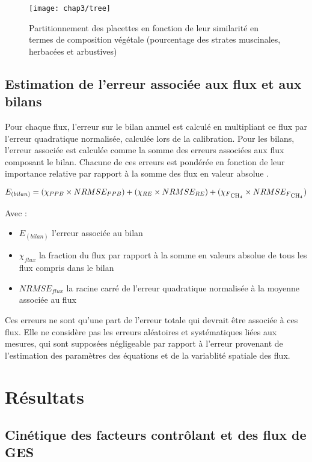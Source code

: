 \begin{figure}[t]
\centering
\texttt{[image: chap3/tree]}
\caption{Partitionnement des placettes en fonction de leur similarité en termes de composition végétale (pourcentage des strates muscinales, herbacées et arbustives)}
\label{fig:tree}
\end{figure}


\subsection{Estimation de l'erreur associée aux flux et aux bilans}

Pour chaque flux, l'erreur sur le bilan annuel est calculé en multipliant ce flux par l'erreur quadratique normalisée, calculée lors de la calibration.
Pour les bilans, l'erreur associée est calculée comme la somme des erreurs associées aux flux composant le bilan.
Chacune de ces erreurs est pondérée en fonction de leur importance relative par rapport à la somme des flux en valeur absolue \citep{waddington2000}.

\begin{equation}
E_{(bilan)} = (\chi_{PPB} \times NRMSE_{PPB}) + (\chi_{RE} \times NRMSE_{RE}) + (\chi_{F\textsubscript{CH\textsubscript{4}}} \times NRMSE_{F\textsubscript{CH\textsubscript{4}}})
\end{equation}

Avec : 
\begin{itemize}
\item $E_{(bilan)}$ l'erreur associée au bilan
\item $\chi_{flux}$ la fraction du flux par rapport à la somme en valeurs absolue de tous les flux compris dans le bilan
\item $NRMSE_{flux}$ la racine carré de l'erreur quadratique normalisée à la moyenne associée au flux
\end{itemize}

Ces erreurs ne sont qu'une part de l'erreur totale qui devrait être associée à ces flux. Elle ne considère pas les erreurs aléatoires et systématiques liées aux mesures, qui sont supposées négligeable par rapport à l'erreur provenant de l'estimation des paramètres des équations et de la variablité spatiale des flux.


\section{Résultats}

\subsection{Cinétique des facteurs contrôlant et des flux de GES}

